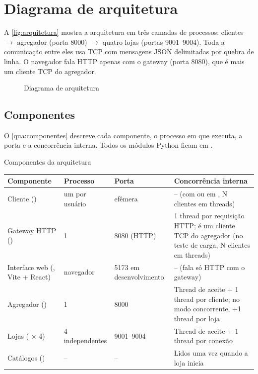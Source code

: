 \chapter{Diagrama de arquitetura}

A \autoref{fig:arquitetura} mostra a arquitetura em três camadas de processos: clientes $\rightarrow$ agregador (porta 8000) $\rightarrow$ quatro lojas (portas 9001--9004). Toda a comunicação entre eles usa TCP com mensagens JSON delimitadas por quebra de linha. O navegador fala HTTP apenas com o gateway (porta 8080), que é mais um cliente TCP do agregador.

\begin{figure}[!htbp]
  \centering
  \caption{Diagrama de arquitetura}\label{fig:arquitetura}
  \fonteautores
\end{figure}

\section{Componentes}

O \autoref{qua:componentes} descreve cada componente, o processo em que executa, a porta e a concorrência interna. Todos os módulos Python ficam em .

\begin{quadro}[!htbp]
  \centering\small
  \caption{Componentes da arquitetura}\label{qua:componentes}
  \begin{tabularx}{\textwidth}{|L{3.6cm}|L{2.0cm}|L{2.2cm}|Y|}
    \hline
    \textbf{Componente} & \textbf{Processo} & \textbf{Porta} & \textbf{Concorrência interna} \\ \hline
    Cliente () & um por usuário & efêmera & -- (com  ou em , N clientes em threads) \\ \hline
    Gateway HTTP () & 1 & 8080 (HTTP) & 1 thread por requisição HTTP; é um cliente TCP do agregador (no teste de carga, N clientes em threads) \\ \hline
    Interface web (, Vite + React) & navegador & 5173 em desenvolvimento & -- (fala só HTTP com o gateway) \\ \hline
    Agregador () & 1 & 8000 & Thread de aceite + 1 thread por cliente; no modo concorrente, +1 thread por loja \\ \hline
    Lojas ( × 4) & 4 independentes & 9001--9004 & Thread de aceite + 1 thread por conexão \\ \hline
    Catálogos () & -- & -- & Lidos uma vez quando a loja inicia \\ \hline
  \end{tabularx}
  \fonteautores
\end{quadro}

